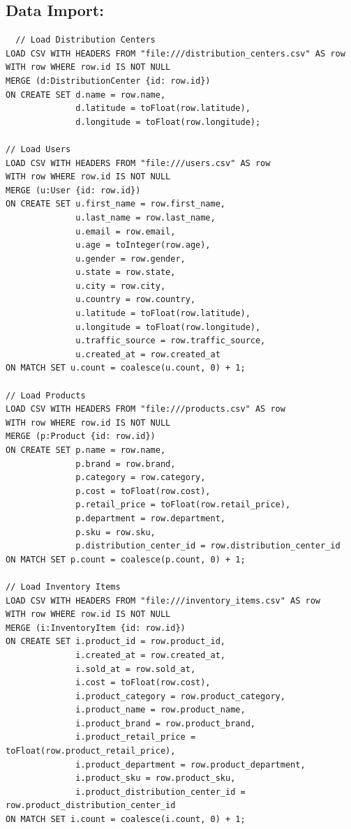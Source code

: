 \documentclass[a4paper,12pt]{article}
\begin{document}
\subsection{Data Import:}
\begin{verbatim}
  // Load Distribution Centers
LOAD CSV WITH HEADERS FROM "file:///distribution_centers.csv" AS row
WITH row WHERE row.id IS NOT NULL
MERGE (d:DistributionCenter {id: row.id})
ON CREATE SET d.name = row.name,
              d.latitude = toFloat(row.latitude),
              d.longitude = toFloat(row.longitude);

// Load Users
LOAD CSV WITH HEADERS FROM "file:///users.csv" AS row
WITH row WHERE row.id IS NOT NULL
MERGE (u:User {id: row.id})
ON CREATE SET u.first_name = row.first_name,
              u.last_name = row.last_name,
              u.email = row.email,
              u.age = toInteger(row.age),
              u.gender = row.gender,
              u.state = row.state,
              u.city = row.city,
              u.country = row.country,
              u.latitude = toFloat(row.latitude),
              u.longitude = toFloat(row.longitude),
              u.traffic_source = row.traffic_source,
              u.created_at = row.created_at
ON MATCH SET u.count = coalesce(u.count, 0) + 1;

// Load Products
LOAD CSV WITH HEADERS FROM "file:///products.csv" AS row
WITH row WHERE row.id IS NOT NULL
MERGE (p:Product {id: row.id})
ON CREATE SET p.name = row.name,
              p.brand = row.brand,
              p.category = row.category,
              p.cost = toFloat(row.cost),
              p.retail_price = toFloat(row.retail_price),
              p.department = row.department,
              p.sku = row.sku,
              p.distribution_center_id = row.distribution_center_id
ON MATCH SET p.count = coalesce(p.count, 0) + 1;

// Load Inventory Items
LOAD CSV WITH HEADERS FROM "file:///inventory_items.csv" AS row
WITH row WHERE row.id IS NOT NULL
MERGE (i:InventoryItem {id: row.id})
ON CREATE SET i.product_id = row.product_id,
              i.created_at = row.created_at,
              i.sold_at = row.sold_at,
              i.cost = toFloat(row.cost),
              i.product_category = row.product_category,
              i.product_name = row.product_name,
              i.product_brand = row.product_brand,
              i.product_retail_price = toFloat(row.product_retail_price),
              i.product_department = row.product_department,
              i.product_sku = row.product_sku,
              i.product_distribution_center_id = row.product_distribution_center_id
ON MATCH SET i.count = coalesce(i.count, 0) + 1;


\end{verbatim}
\end{document}
